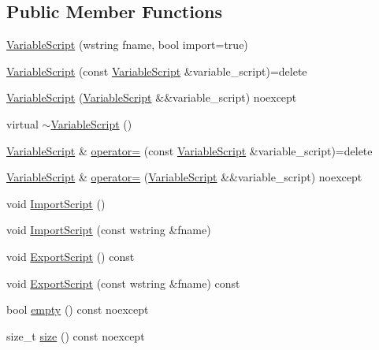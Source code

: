 \subsection*{Public Member Functions}
\begin{DoxyCompactItemize}
\item 
\hyperlink{classmage_1_1_variable_script_a87830f09a97aa8f7df3074029c5ab8d5}{Variable\+Script} (wstring fname, bool import=true)
\item 
\hyperlink{classmage_1_1_variable_script_aebd4e6cf2bdae4e57c9da428007fc4d7}{Variable\+Script} (const \hyperlink{classmage_1_1_variable_script}{Variable\+Script} \&variable\+\_\+script)=delete
\item 
\hyperlink{classmage_1_1_variable_script_ac29cca638a32bccae00a9e53404158d5}{Variable\+Script} (\hyperlink{classmage_1_1_variable_script}{Variable\+Script} \&\&variable\+\_\+script) noexcept
\item 
virtual \hyperlink{classmage_1_1_variable_script_ae7026e1283b1a1164f02fdc3e1f2b829}{$\sim$\+Variable\+Script} ()
\item 
\hyperlink{classmage_1_1_variable_script}{Variable\+Script} \& \hyperlink{classmage_1_1_variable_script_ae090b066ea939fc6611e77a47df6a97f}{operator=} (const \hyperlink{classmage_1_1_variable_script}{Variable\+Script} \&variable\+\_\+script)=delete
\item 
\hyperlink{classmage_1_1_variable_script}{Variable\+Script} \& \hyperlink{classmage_1_1_variable_script_a7cb6a585a701268aaac38d8f039fc403}{operator=} (\hyperlink{classmage_1_1_variable_script}{Variable\+Script} \&\&variable\+\_\+script) noexcept
\item 
void \hyperlink{classmage_1_1_variable_script_a5f1cc3bfb611edbc8dfb433ec55cc965}{Import\+Script} ()
\item 
void \hyperlink{classmage_1_1_variable_script_ae8bbfb30b5d47b5c66cd1b45bdd2cec5}{Import\+Script} (const wstring \&fname)
\item 
void \hyperlink{classmage_1_1_variable_script_ab12b7f789f6af2b301ff350fa401b324}{Export\+Script} () const
\item 
void \hyperlink{classmage_1_1_variable_script_a05ce2bcc72418422a443bcd8eff23486}{Export\+Script} (const wstring \&fname) const
\item 
bool \hyperlink{classmage_1_1_variable_script_a8a3f47783455cd6264dfc996887fd0f0}{empty} () const noexcept
\item 
size\+\_\+t \hyperlink{classmage_1_1_variable_script_a20e376c802dae71e001037afc316c795}{size} () const noexcept

\end{DoxyCompactItemize}
